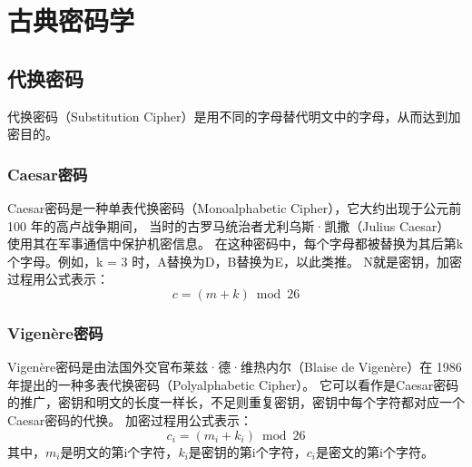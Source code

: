 \section{古典密码学}
\subsection{代换密码}
代换密码（Substitution Cipher）是用不同的字母替代明文中的字母，从而达到加密目的。

\subsubsection{Caesar密码}
Caesar密码是一种单表代换密码（Monoalphabetic Cipher），它大约出现于公元前 100 年的高卢战争期间，
当时的古罗马统治者尤利乌斯·凯撒（Julius Caesar） 使用其在军事通信中保护机密信息。
在这种密码中，每个字母都被替换为其后第k个字母。例如，k = 3 时，A替换为D，B替换为E，以此类推。
N就是密钥，加密过程用公式表示：$$c = (m + k) \bmod 26$$

\subsubsection{Vigenère密码}
Vigenère密码是由法国外交官布莱兹·德·维热内尔（Blaise de Vigenère）在 1986 年提出的一种多表代换密码（Polyalphabetic Cipher）。
它可以看作是Caesar密码的推广，密钥和明文的长度一样长，不足则重复密钥，密钥中每个字符都对应一个Caesar密码的代换。
加密过程用公式表示：$$c_i = (m_i + k_i) \bmod 26$$
其中，$m_i$是明文的第i个字符，$k_i$是密钥的第i个字符，$c_i$是密文的第i个字符。

